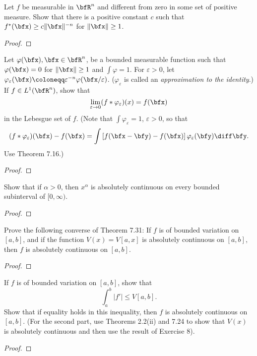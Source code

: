
\begin{problem}
Let $f$ be measurable in $\bfR^n$ and different from zero in some set of
positive measure. Show that there is a positive constant $c$ such that
$f^*(\bfx)\geq c\|\bfx\|^{-n}$ for $\|\bfx\|\geq 1$.
\end{problem}
\begin{proof}

\end{proof}
\newpage

\begin{problem}
Let $\varphi(\bfx),\bfx\in\bfR^n$, be a bounded measurable function such
that $\varphi(\bfx)=0$ for $\|\bfx\|\geq 1$ and $\int\varphi=1$. For
$\varepsilon>0$, let
$\varphi_\varepsilon(\bfx)\coloneqq\varepsilon^{-n}\varphi(\bfx/\varepsilon)$. ($\varphi_\varepsilon$
is called an \emph{approximation to the identity}.) If $f\in L^1(\bfR^n)$,
show that
\[
\lim_{\varepsilon\to 0}(f*\varphi_\varepsilon)(x)=f(\bfx)
\]
in the Lebesgue set of $f$. (Note that $\int\varphi_\varepsilon=1$,
$\varepsilon>0$, so that
\[
(f*\varphi_\varepsilon)(\bfx)-f(\bfx)=\int\left[f(\bfx-\bfy)-f(\bfx)\right]\varphi_\varepsilon(\bfy)\diff\bfy.
\]
Use Theorem 7.16.)
\end{problem}
\begin{proof}
\end{proof}
\newpage

\begin{problem}
Show that if $\alpha>0$, then $x^\alpha$ is absolutely continuous on every
bounded subinterval of $[0,\infty)$.
\end{problem}
\begin{proof}
\end{proof}
\newpage


\begin{problem}
Prove the following converse of Theorem 7.31: If $f$ is of bounded
variation on $[a,b]$, and if the function $V(x)=V[a,x]$ is absolutely
continuous on $[a,b]$, then $f$ is absolutely continuous on $[a,b]$.
\end{problem}
\begin{proof}
\end{proof}
\newpage

\begin{problem}
If $f$ is of bounded variation on $[a,b]$, show that
\[
\int_a^b|f'|\leq V[a,b].
\]
Show that if equality holds in this inequality, then $f$ is absolutely
continuous on $[a,b]$. (For the second part, use Theorems 2.2(ii) and 7.24
to show that $V(x)$ is absolutely continuous and then use the result of
Exercise 8).
\end{problem}
\begin{proof}
\end{proof}
\newpage

